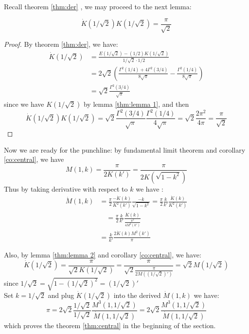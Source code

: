 \documentclass{report}
\begin{document}
\begin{titlepage}
Recall theorem \ref{thm:der} , we may proceed to the next lemma:
\begin{lemma}\label{thm:lemma 2}{\rm\cite{Borwein:1987aa}}
\[
\dot K(1/\sqrt2)K(1/\sqrt2)=\frac{\pi}{\sqrt2}
\]
\begin{proof}%
By theorem \ref{thm:der}, we have:
\begin{align*}
\dot K(1/\sqrt2)&=\frac{E(1/\sqrt2)-(1/2)K(1/\sqrt2)}{1/\sqrt2 \cdot1/2}\\
&=2\sqrt2 \left(\frac{\Gamma^2(1/4)+4\Gamma^2(3/4)}{8\sqrt\pi}-\frac{\Gamma^2(1/4)}{8\sqrt{\pi}}\right)\\
&=\sqrt2 \frac{\Gamma^2(3/4)}{\sqrt\pi}
\end{align*}
since we have $K(1/\sqrt2)$ by lemma \ref{thm:lemma 1}, and then
\[
\dot K(1/\sqrt2)K(1/\sqrt2)=\sqrt2 \frac{\Gamma^2(3/4)}{\sqrt\pi}\frac{\Gamma^2(1/4)}{4\sqrt{\pi}}=\sqrt2 \frac{2\pi^2}{4\pi}=\frac{\pi}{\sqrt2}
\]
\end{proof}
\end{lemma}
\bigskip
Now we are ready for the punchline: by fundamental limit theorem and corollary \ref{co:central}, we have
\[
M(1,k)=\frac{\pi}{2K(k')}=\frac{\pi}{2K(\sqrt{1-k^2})}
\]
Thus by taking derivative with respect to $k$ we have \cite{Borwein:1987aa}:
\begin{align*}
\dot M(1,k)&=\frac{\pi}{2}\frac{-\dot K(k)}{K^2(k')}\frac{-k}{\sqrt{1-k^2}}=\frac{\pi}{2}\frac{k}{k'}\frac{\dot K(k)}{K^2(k')}\\
&\quad=\frac{\pi}{2}\frac{k}{k'}\frac{\dot K(k)}{\frac{\pi^2}{4M^2(k')}}\\
&=\frac{k}{k'}\frac{2\dot K(k)M^2(k')}{\pi}
\end{align*}

\noindent Also, by lemma \ref{thm:lemma 2} and corollary \ref{co:central}, we have:
\[
\dot K(1/\sqrt2)=\frac{\pi}{\sqrt2K(1/\sqrt2)}=\frac{\pi}{\sqrt2\frac{\pi}{2M((1/\sqrt2)')}}=\sqrt2{M(1/\sqrt2)}
\]
since $1/\sqrt2=\sqrt{1-(1/\sqrt2)^2}=(1/\sqrt2)'$\\
Set $k=1/\sqrt2$ and plug $\dot K(1/\sqrt2)$ into the derived $\dot M(1,k)$ we have:
\[
\pi=2\sqrt2\frac{1/\sqrt2}{1/\sqrt2}\frac{M^3(1,1/\sqrt2)}{\dot M(1,1/\sqrt2)}=2\sqrt2\frac{M^3(1,1/\sqrt2)}{\dot M(1,1/\sqrt2)}
\]
which proves the theorem 
\ref{thm:central} in the beginning of the section.
\bigskip


\end{titlepage}
\end{document}
